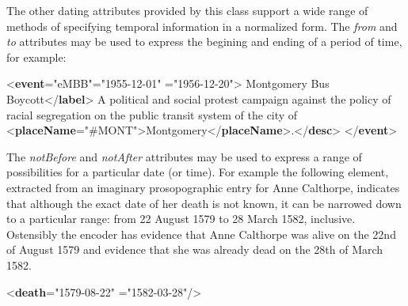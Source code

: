 The other dating attributes provided by this class support a wide range of methods of specifying temporal information in a normalized form. The {\itshape from} and {\itshape to} attributes may be used to express the begining and ending of a period of time, for example: \par\bgroup{}\exampleFont \begin{shaded}\noindent\mbox{}{<\textbf{event}\hspace*{1em}{xml:id}="{eMBB}"\hspace*{1em}{from}="{1955-12-01}"\mbox{}\newline 
\hspace*{1em}{to}="{1956-12-20}">}\mbox{}\newline 
{}Montgomery Bus Boycott{</\textbf{label}>}\mbox{}\newline 
{}A political and social protest campaign against the policy of racial segregation on the public transit system of\mbox{}\newline 
\hspace*{1em}\hspace*{1em} the city of {<\textbf{placeName}\hspace*{1em}{ref}="{\#MONT}">}Montgomery{</\textbf{placeName}>}.{</\textbf{desc}>}\mbox{}\newline 
{</\textbf{event}>}\end{shaded}\egroup\par \par
The {\itshape notBefore} and {\itshape notAfter} attributes may be used to express a range of possibilities for a particular date (or time). For example the following element, extracted from an imaginary prosopographic entry for Anne Calthorpe, indicates that although the exact date of her death is not known, it can be narrowed down to a particular range: from 22 August 1579 to 28 March 1582, inclusive. Ostensibly the encoder has evidence that Anne Calthorpe was alive on the 22nd of August 1579 and evidence that she was already dead on the 28th of March 1582. \par\bgroup{}\exampleFont \begin{shaded}\noindent\mbox{}{<\textbf{death}\hspace*{1em}{notBefore}="{1579-08-22}"\mbox{}\newline 
\hspace*{1em}{notAfter}="{1582-03-28}"/>}\end{shaded}\egroup\par \par
